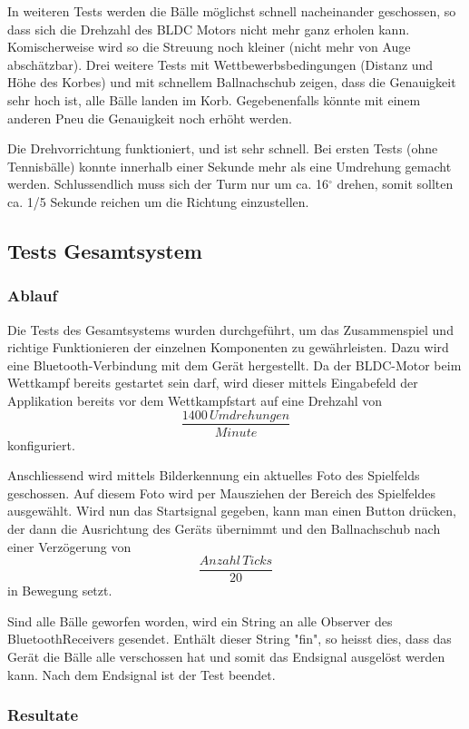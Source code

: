 In weiteren Tests werden die Bälle möglichst schnell nacheinander geschossen, so dass sich die Drehzahl des BLDC Motors nicht mehr ganz erholen kann. Komischerweise wird so die Streuung noch kleiner (nicht mehr von Auge abschätzbar). Drei weitere Tests mit Wettbewerbsbedingungen (Distanz und Höhe des Korbes) und mit schnellem Ballnachschub zeigen, dass die Genauigkeit sehr hoch ist, alle Bälle landen im Korb. Gegebenenfalls könnte mit einem anderen Pneu die Genauigkeit noch erhöht werden.

Die Drehvorrichtung funktioniert, und ist sehr schnell. Bei ersten Tests (ohne Tennisbälle) konnte innerhalb einer Sekunde mehr als eine Umdrehung gemacht werden. Schlussendlich muss sich der Turm nur um ca. 16$^\circ$ drehen, somit sollten ca. 1/5 Sekunde reichen um die Richtung einzustellen.



\subsection{Tests Gesamtsystem}
\subsubsection{Ablauf}
Die Tests des Gesamtsystems wurden durchgeführt, um das Zusammenspiel und richtige Funktionieren der einzelnen Komponenten zu gewährleisten. Dazu wird eine Bluetooth-Verbindung mit dem Gerät hergestellt. Da der BLDC-Motor beim Wettkampf bereits gestartet sein darf, wird dieser mittels Eingabefeld der Applikation bereits vor dem Wettkampfstart auf eine Drehzahl von \[\frac{1400\,Umdrehungen}{Minute}\] konfiguriert.

Anschliessend wird mittels Bilderkennung ein aktuelles Foto des Spielfelds geschossen. Auf diesem Foto wird per Mausziehen der Bereich des Spielfeldes ausgewählt. Wird nun das Startsignal gegeben, kann man einen Button drücken, der dann die Ausrichtung des Geräts übernimmt und den Ballnachschub nach einer Verzögerung von \[\frac{Anzahl\,Ticks}{20}\] in Bewegung setzt.

Sind alle Bälle geworfen worden, wird ein String an alle Observer des BluetoothReceivers gesendet. Enthält dieser String "fin", so heisst dies, dass das Gerät die Bälle alle verschossen hat und somit das Endsignal ausgelöst werden kann. Nach dem Endsignal ist der Test beendet.

\subsubsection{Resultate}

